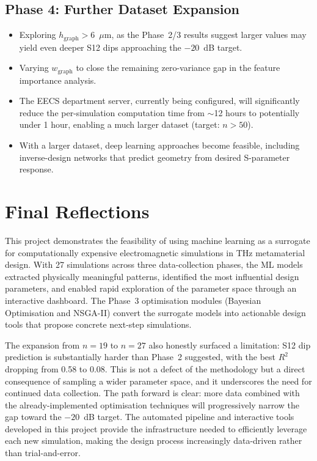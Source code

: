 \documentclass[12pt,a4paper]{report}
\begin{document}
\subsection{Phase 4: Further Dataset Expansion}

\begin{itemize}[leftmargin=2cm]
    \item Exploring $h_{\text{graph}} > 6$~$\mu$m, as the Phase~2/3 results suggest larger values may yield even deeper S12 dips approaching the $-20$~dB target.
    \item Varying $w_{\text{graph}}$ to close the remaining zero-variance gap in the feature importance analysis.
    \item The EECS department server, currently being configured, will significantly reduce the per-simulation computation time from $\sim$12 hours to potentially under 1 hour, enabling a much larger dataset (target: $n > 50$).
    \item With a larger dataset, deep learning approaches become feasible, including inverse-design networks that predict geometry from desired S-parameter response.
\end{itemize}

\section{Final Reflections}
\label{sec:reflections}

This project demonstrates the feasibility of using machine learning as a surrogate for computationally expensive electromagnetic simulations in THz metamaterial design. With 27 simulations across three data-collection phases, the ML models extracted physically meaningful patterns, identified the most influential design parameters, and enabled rapid exploration of the parameter space through an interactive dashboard. The Phase~3 optimisation modules (Bayesian Optimisation and NSGA-II) convert the surrogate models into actionable design tools that propose concrete next-step simulations.

The expansion from $n=19$ to $n=27$ also honestly surfaced a limitation: S12 dip prediction is substantially harder than Phase~2 suggested, with the best $R^2$ dropping from 0.58 to 0.08. This is not a defect of the methodology but a direct consequence of sampling a wider parameter space, and it underscores the need for continued data collection. The path forward is clear: more data combined with the already-implemented optimisation techniques will progressively narrow the gap toward the $-20$~dB target. The automated pipeline and interactive tools developed in this project provide the infrastructure needed to efficiently leverage each new simulation, making the design process increasingly data-driven rather than trial-and-error.
\end{document}
